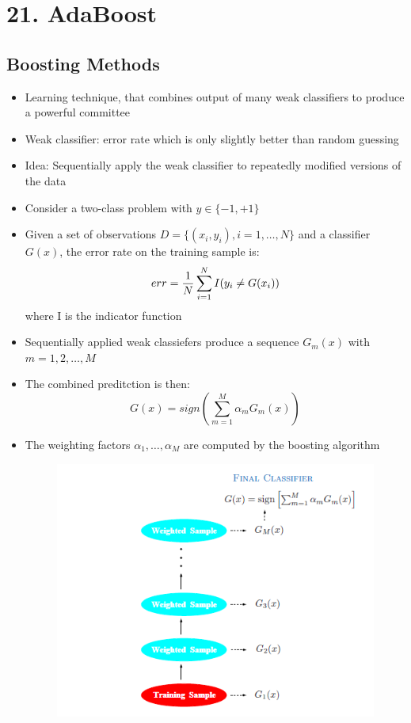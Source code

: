 \section*{21. AdaBoost}
\subsection*{Boosting Methods}
\begin{itemize}
    \item
        Learning technique, that combines output of many weak classifiers to produce a powerful committee
    \item
        Weak classifier: error rate which is only slightly better than random guessing
    \item
        Idea: Sequentially apply the weak classifier to repeatedly modified versions of the data\\
    \item
        Consider a two-class problem with $y \in \{-1, +1\}$
    \item
        Given a set of observations $D = \{(x_i, y_i), i=1, \dots, N\}$ and a classifier $G(x)$, the error rate on the training sample is:
        $$err = \frac{\displaystyle 1}{\displaystyle N} \sum_{i=1}^{N} I(y_i \neq G(x_i))$$
        where I is the indicator function 
    \item
        Sequentially applied weak classiefers produce a sequence $G_m(x)$ with $m = 1,2,\dots,M$
    \item
        The combined preditction is then:
        $$G(x) = sign(\sum_{m=1}^{M} \alpha_m G_m(x))$$
    \item
        The weighting factors $\alpha_1, \dots, \alpha_M$ are computed by the boosting algorithm
        \begin{figure}[H]
            \centering
            \includegraphics[scale=1]{figures/ada}

\end{figure}
\end{itemize}
